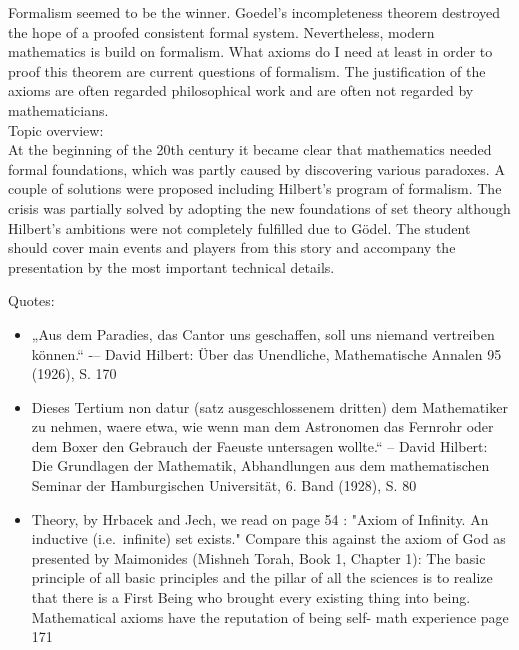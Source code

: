 \documentclass[hidelinks]{article}
\theoremstyle{plain}
\theoremstyle{definition}
\theoremstyle{rem}
\begin{document}
Formalism seemed to be the winner. Goedel's incompleteness theorem destroyed the hope of a proofed consistent formal system. Nevertheless, modern mathematics is build on formalism. What axioms do I need at least in order to proof this theorem are current questions of formalism. The justification of the axioms are often regarded philosophical work and are often not regarded by mathematicians.
\\

Topic overview:\\
At the beginning of the 20th century it became clear that mathematics needed formal foundations, which was partly caused by discovering various paradoxes. A couple of solutions were proposed including Hilbert's program of formalism. The crisis was partially solved by adopting the new foundations of set theory although Hilbert's ambitions were not completely fulfilled due to Gödel. The student should cover main events and players from this story and accompany the presentation by the most important technical details.



Quotes: 
\begin{itemize}
\item „Aus dem Paradies, das Cantor uns geschaffen, soll uns niemand vertreiben können.“ -– David Hilbert: Über das Unendliche, Mathematische Annalen 95 (1926), S. 170 
\item Dieses Tertium non datur (satz ausgeschlossenem dritten) dem Mathematiker zu nehmen, waere etwa, wie wenn man dem Astronomen das Fernrohr oder dem Boxer den Gebrauch der Faeuste untersagen wollte.“ – David Hilbert: Die Grundlagen der Mathematik, Abhandlungen aus dem mathematischen Seminar der Hamburgischen Universität, 6. Band (1928), S. 80
\item Theory, by Hrbacek and Jech, we read on page 54 :
	"Axiom of Infinity. An inductive (i.e.\ infinite) set exists." Compare this against the axiom of God as presented by Maimonides (Mishneh Torah, Book 1, Chapter 1): The basic principle of all basic principles and the pillar of all the sciences is to realize that there is a First Being who brought every existing thing into being.  Mathematical axioms have the reputation of being self- math experience page 171
\end{itemize}

\newpage


\end{document}
